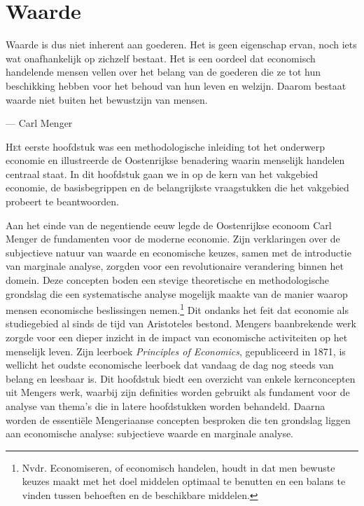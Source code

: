 \chapter{Waarde}

\begin{blockquotebox}
    Waarde is dus niet inherent aan goederen. Het is geen eigenschap ervan, noch iets wat onafhankelijk op zichzelf bestaat. Het is een oordeel dat economisch handelende mensen vellen over het belang van de goederen die ze tot hun beschikking hebben voor het behoud van hun leven en welzijn. Daarom bestaat waarde niet buiten het bewustzijn van mensen.\footnotemark
    \par\raggedleft--- Carl Menger
\end{blockquotebox}

\lettrine{H}et eerste hoofdstuk was een methodologische inleiding tot het onderwerp economie en illustreerde de Oostenrijkse benadering waarin menselijk handelen centraal staat. In dit hoofdstuk gaan we in op de kern van het vakgebied economie, de basisbegrippen en de belangrijkste vraagstukken die het vakgebied probeert te beantwoorden.

Aan het einde van de negentiende eeuw legde de Oostenrijkse econoom Carl Menger de fundamenten voor de moderne economie. Zijn verklaringen over de subjectieve natuur van waarde en economische keuzes, samen met de introductie van marginale analyse, zorgden voor een revolutionaire verandering binnen het domein. Deze concepten boden een stevige theoretische en methodologische grondslag die een systematische analyse mogelijk maakte van de manier waarop mensen economische beslissingen nemen.\footnote{Nvdr. Economiseren, of economisch handelen, houdt in dat men bewuste keuzes maakt met het doel middelen optimaal te benutten en een balans te vinden tussen behoeften en de beschikbare middelen.} Dit ondanks het feit dat economie als studiegebied al sinds de tijd van Aristoteles bestond. Mengers baanbrekende werk zorgde voor een dieper inzicht in de impact van economische activiteiten op het menselijk leven. Zijn leerboek \textit{Principles of Economics}, gepubliceerd in 1871, is wellicht het oudste economische leerboek dat vandaag de dag nog steeds van belang en leesbaar is. Dit hoofdstuk biedt een overzicht van enkele kernconcepten uit Mengers werk, waarbij zijn definities worden gebruikt als fundament voor de analyse van thema's die in latere hoofdstukken worden behandeld. Daarna worden de essentiële Mengeriaanse concepten besproken die ten grondslag liggen aan economische analyse: subjectieve waarde en marginale analyse.

